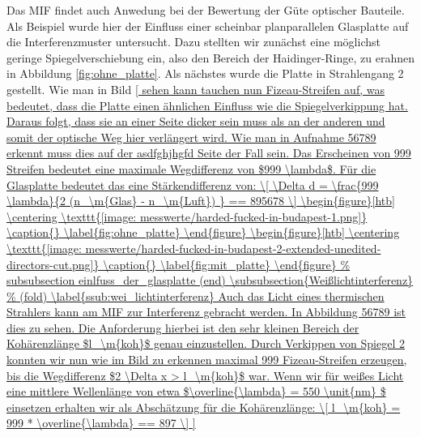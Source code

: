 			Das MIF findet auch Anwedung bei der Bewertung der Güte optischer Bauteile.
			Als Beispiel wurde hier der Einfluss einer scheinbar planparallelen Glasplatte auf die Interferenzmuster untersucht.
			Dazu stellten wir zunächst eine möglichst geringe Spiegelverschiebung ein, also den Bereich der Haidinger-Ringe, zu erahnen in Abbildung \ref{fig:ohne_platte}.
			Als nächstes wurde die Platte in Strahlengang 2 gestellt.
			Wie man in Bild \ref{ sehen kann tauchen nun Fizeau-Streifen auf, was bedeutet, dass die Platte einen ähnlichen Einfluss wie die Spiegelverkippung hat.
			Daraus folgt, dass sie an einer Seite dicker sein muss als an der anderen und somit der optische Weg hier verlängert wird.
			Wie man in Aufnahme 56789 erkennt muss dies auf der asdfghjhgfd Seite der Fall sein.
			Das Erscheinen von 999 Streifen bedeutet eine maximale Wegdifferenz von $999 \lambda$.
			Für die Glasplatte bedeutet das eine Stärkendifferenz von:
			\[ \Delta d = \frac{999 \lambda}{2 (n_\m{Glas} - n_\m{Luft}) } == 895678 \]

			\begin{figure}[htb]
				\centering
				\texttt{[image: messwerte/harded-fucked-in-budapest-1.png]}
				\caption{}
				\label{fig:ohne_platte}
			\end{figure}

			\begin{figure}[htb]
				\centering
				\texttt{[image: messwerte/harded-fucked-in-budapest-2-extended-unedited-directors-cut.png]}
				\caption{}
				\label{fig:mit_platte}
			\end{figure}


		\subsubsection{Weißlichtinterferenz} %
		\label{ssub:wei_lichtinterferenz}

			Auch das Licht eines thermischen Strahlers kann am MIF zur Interferenz gebracht werden.
			In Abbildung 56789 ist dies zu sehen.
			Die Anforderung hierbei ist den sehr kleinen Bereich der Kohärenzlänge $l_\m{koh}$ genau einzustellen.
			Durch Verkippen von Spiegel 2 konnten wir nun wie im Bild zu erkennen maximal 999 Fizeau-Streifen erzeugen, bis die Wegdifferenz $2 \Delta x > l_\m{koh}$ war.
			Wenn wir für weißes Licht eine mittlere Wellenlänge von etwa $\overline{\lambda} = 550 \unit{nm} $ einsetzen erhalten wir als Abschätzung für die Kohärenzlänge:
			\[ l_\m{koh} = 999 * \overline{\lambda} == 897 \]

}
